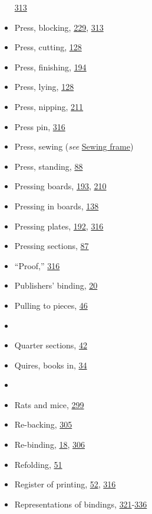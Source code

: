 \documentclass[
]{article}
\begin{document}
\begin{itemize}
  \protect\hyperlink{Page_313}{313}
\item
  Press, blocking, \protect\hyperlink{Page_229}{229},
  \protect\hyperlink{Page_313}{313}
\item
  Press, cutting, \protect\hyperlink{Page_128}{128}
\item
  Press, finishing, \protect\hyperlink{Page_194}{194}
\item
  Press, lying, \protect\hyperlink{Page_128}{128}
\item
  Press, nipping, \protect\hyperlink{Page_211}{211}
\item
  Press pin, \protect\hyperlink{Page_316}{316}
\item
  Press, sewing (\emph{see} \protect\hyperlink{Sewing_frame}{Sewing
  frame})
\item
  Press, standing, \protect\hyperlink{Page_88}{88}
\item
  Pressing boards, \protect\hyperlink{Page_193}{193},
  \protect\hyperlink{Page_210}{210}
\item
  Pressing in boards, \protect\hyperlink{Page_138}{138}
\item
  Pressing plates, \protect\hyperlink{Page_192}{192},
  \protect\hyperlink{Page_316}{316}
\item
  Pressing sections, \protect\hyperlink{Page_87}{87}
\item
  ``Proof,'' \protect\hyperlink{Page_316}{316}
\item
  Publishers' binding, \protect\hyperlink{Page_20}{20}
\item
  Pulling to pieces, \protect\hyperlink{Page_46}{46}
\item
  ~
\item
  {Quarter} sections, \protect\hyperlink{Page_42}{42}
\item
  Quires, books in, \protect\hyperlink{Page_34}{34}
\item
  ~
\item
  {Rats} and mice, \protect\hyperlink{Page_299}{299}
\item
  Re-backing, \protect\hyperlink{Page_305}{305}
\item
  Re-binding, \protect\hyperlink{Page_18}{18},
  \protect\hyperlink{Page_306}{306}
\item
  Refolding, \protect\hyperlink{Page_51}{51}
\item
  Register of printing, \protect\hyperlink{Page_52}{52},
  \protect\hyperlink{Page_316}{316}
\item
  Representations of bindings,
  \protect\hyperlink{Page_321}{321}-\protect\hyperlink{Page_336}{336}

\end{itemize}
\end{document}
